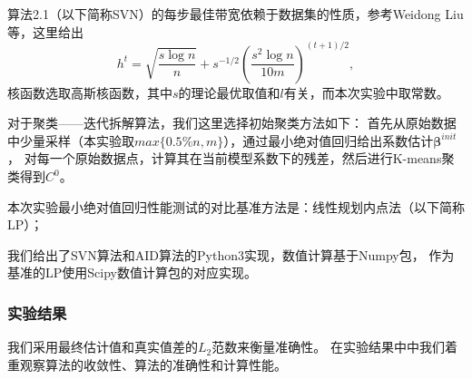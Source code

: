 算法2.1（以下简称SVN）的每步最佳带宽依赖于数据集的性质，参考Weidong Liu等\cite{svn}，这里给出
$$
    h^t = \sqrt{\frac{s\log n}{n}} + s^{-1/2} (\frac{s^2\log n}{10m})^{(t+1)/2},
$$
核函数选取高斯核函数，其中$s$的理论最优取值和$l$有关，而本次实验中取常数。

对于聚类——迭代拆解算法，我们这里选择初始聚类方法如下：
首先从原始数据中少量采样（本实验取$max\{0.5\%n, m\}$），通过最小绝对值回归给出系数估计$\bm{\beta}^{init}$，
对每一个原始数据点，计算其在当前模型系数下的残差，然后进行K-means聚类得到$C^0$。

本次实验最小绝对值回归性能测试的对比基准方法是：线性规划内点法（以下简称LP）；

我们给出了SVN算法和AID算法的Python3实现，数值计算基于Numpy包，
作为基准的LP使用Scipy数值计算包的对应实现。

\subsubsection{实验结果}
我们采用最终估计值和真实值差的$L_2$范数来衡量准确性。
在实验结果中中我们着重观察算法的收敛性、算法的准确性和计算性能。

